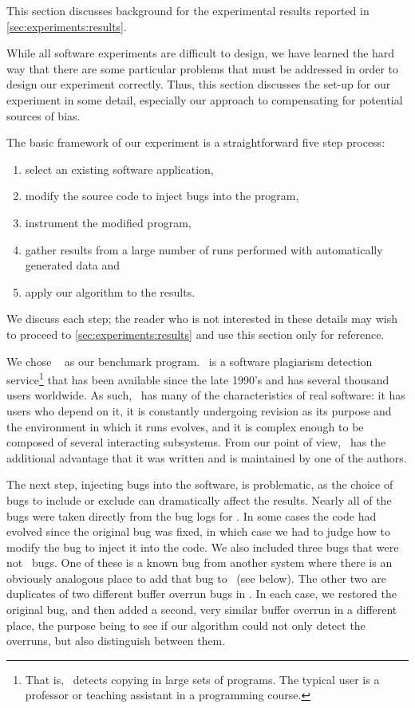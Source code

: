 This section discusses background for the experimental results
reported in \autoref{sec:experiments:results}.

While all software experiments are difficult to design, we have
learned the hard way that there are some particular problems that must
be addressed in order to design our experiment correctly.
Thus, this section discusses the set-up for our
experiment in some detail, especially our approach to compensating for
potential sources of bias.

The basic framework of our experiment is a straightforward five step
process:
\begin{enumerate}
\item select an existing software application,
\item modify the source code to inject bugs into the program,
\item instrument the modified program,
\item gather results from a large number of runs performed with automatically generated data and
\item apply our algorithm to the results.
\end{enumerate}
We discuss each step; the reader who is not interested in
these details may wish to proceed to \autoref{sec:experiments:results} and
use this section only for reference.

We chose \moss\ \cite{Schleimer:2003:WLA} as our benchmark program.  \moss\ is a
software plagiarism detection service\footnote{That is,
\moss\ detects copying in large sets of programs.  The typical \moss
user is a professor or teaching assistant in a programming course.}
that has been available since the late 1990's and has several thousand
users worldwide.  As such, \moss\ has many of the characteristics of
real software: it has users who depend on it, it is constantly
undergoing revision as its purpose and the environment in which it
runs evolves, and it is complex enough to be composed of several
interacting subsystems.
From our point of view, \moss\ has the additional advantage that it
was written and is maintained by one of the authors.

The next step, injecting bugs into the software, is problematic, as
the choice of bugs to include or exclude can dramatically affect the
results.  Nearly all of the bugs were taken directly from the bug
logs for \moss.  In some cases the code had evolved since the original
bug was fixed, in which case we had to judge how to modify the
bug to inject it into the code.  We also included three bugs that
were not \moss\ bugs.  One of these is a known bug from another system
where there is an obviously analogous place to add that bug to \moss\
(see below). The other two are duplicates of two different buffer
overrun bugs in \moss.  In each case, we restored the original bug,
and then added a second, very similar buffer overrun in a different
place, the purpose being to see if our algorithm could not only detect
the overruns, but also distinguish between them.

